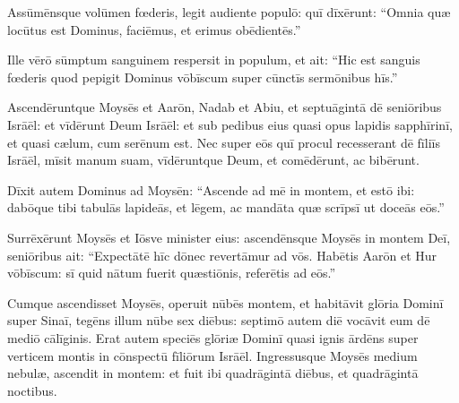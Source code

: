 Assūmēnsque volūmen fœderis, legit audiente populō: quī
dīxērunt: ``Omnia quæ locūtus est Dominus, faciēmus, et erimus
obēdientēs.''

Ille vērō sūmptum sanguinem
respersit in populum, et ait: ``Hic est sanguis fœderis quod
pepigit Dominus vōbīscum super cūnctīs sermōnibus hīs.''

Ascendēruntque Moysēs et Aarōn, Nadab et Abiu, et septuāgintā dē seniōribus
Isrāēl: 
et vīdērunt Deum Isrāēl: et sub pedibus eius quasi opus
lapidis sapphīrinī, et quasi cælum, cum serēnum est. 
Nec
super eōs quī procul recesserant dē fīliīs Isrāēl, mīsit manum suam,
vīdēruntque Deum, et comēdērunt, ac
bibērunt. 

Dīxit autem Dominus ad Moysēn: ``Ascende ad mē
in montem, et estō ibi: dabōque tibi tabulās lapideās, et lēgem, ac mandāta quæ scrīpsī ut doceās eōs.''

Surrēxērunt Moysēs et Iōsve minister eius: ascendēnsque Moysēs in montem
Deī, 
seniōribus ait: ``Expectātē hīc dōnec revertāmur ad
vōs. Habētis Aarōn et Hur vōbīscum: sī quid nātum fuerit
quæstiōnis, referētis ad eōs.''

Cumque ascendisset Moysēs,
operuit nūbēs montem, 
et habitāvit glōria Dominī super Sinaī, tegēns
illum nūbe sex diēbus: septimō autem diē vocāvit eum dē mediō
cālīginis. 
Erat autem speciēs glōriæ Dominī quasi ignis
ārdēns super verticem montis in cōnspectū fīliōrum Isrāēl. 
Ingressusque Moysēs medium nebulæ,
ascendit in montem: et fuit ibi quadrāgintā diēbus, et quadrāgintā
noctibus.
